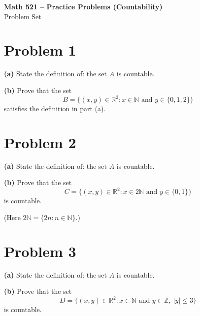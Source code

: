 \documentclass[12pt]{article}
\begin{document}
\begin{center}
    \Large \textbf{Math 521 -- Practice Problems (Countability)}\\
    \normalsize Problem Set
\end{center}

\newpage

\section*{Problem 1}

\textbf{(a)} State the definition of: the set $A$ is countable.

\vspace{1cm}

\textbf{(b)} Prove that the set
\[
B = \{(x,y) \in \mathbb{R}^2 : x \in \mathbb{N} \text{ and } y \in \{0,1,2\}\}
\]
satisfies the definition in part (a).

\vfill
\newpage


\section*{Problem 2}

\textbf{(a)} State the definition of: the set $A$ is countable.

\vspace{1cm}

\textbf{(b)} Prove that the set
\[
C = \{(x,y) \in \mathbb{R}^2 : x \in 2\mathbb{N} \text{ and } y \in \{0,1\}\}
\]
is countable.

(Here $2\mathbb{N} = \{2n : n \in \mathbb{N}\}$.)

\vfill
\newpage


\section*{Problem 3}

\textbf{(a)} State the definition of: the set $A$ is countable.

\vspace{1cm}

\textbf{(b)} Prove that the set
\[
D = \{(x,y) \in \mathbb{R}^2 : x \in \mathbb{N} \text{ and } y \in \mathbb{Z}, \ |y| \le 3\}
\]
is countable.
\end{document}
